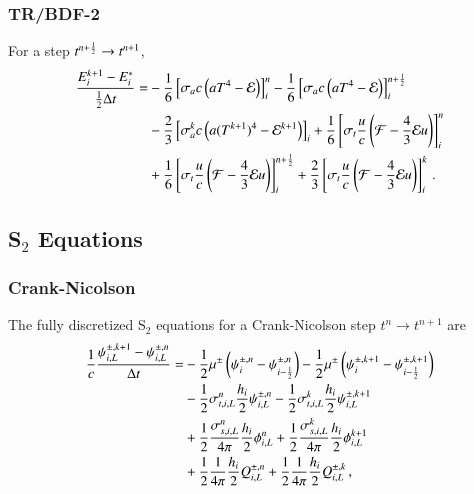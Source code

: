 \documentclass[preprint,12pt]{elsarticle}
\begin{document}
\subsubsection{TR/BDF-2}
For a step $t^{n+\frac{1}{2}}\rightarrow t^{n+1}$,
\begin{equation}\begin{split}
  \frac{E_i^{k+1}-E_i^*}{\half\dt} = &
  -\sixth\left[\sigma_a c\left(aT^4 - \E\right)\right]_i^n
  -\sixth\left[\sigma_a c\left(aT^4 - \E\right)\right]_i^{n+\half}\\
  &-\frac{2}{3}\left[\sigma_a^k c\left(a(T^{k+1})^4 - \E^{k+1}\right)\right]_i
   +\sixth\left[\sigma_t\frac{u}{c}\left(\F-\frac{4}{3}\E u\right)\right]_i^n\\
  &+\sixth\left[\sigma_t\frac{u}{c}\left(\F-\frac{4}{3}\E u\right)\right]_i^{n+\half}
   +\frac{2}{3}\left[\sigma_t\frac{u}{c}\left(\F-\frac{4}{3}\E u\right)\right]_i^k
  \pep
\lequ{hydroEBDF2full}
\end{split}\end{equation}

\subsection{\texorpdfstring{S$_2$}{S-2} Equations}
\subsubsection{Crank-Nicolson}
The fully discretized S$_2$ equations for a Crank-Nicolson step
$t^n\rightarrow t^{n+1}$ are
\begin{equation}\begin{split}
\frac{1}{c}\frac{\psi\iL^{\pm,k+1}-\psi\iL^{\pm,n}}{\dt} = &
  -\half\mu^\pm\fn{\psi^{\pm,n}_i - \psi^{\pm,n}_{i-\half}}
  -\half\mu^\pm\fn{\psi^{\pm,k+1}_i - \psi^{\pm,k+1}_{i-\half}}\\
  &-\half\sigma_{t,i,L}^n\frac{h_i}{2}\psi\iL^{\pm,n}
   -\half\sigma_{t,i,L}^k\frac{h_i}{2}\psi\iL^{\pm,k+1}\\
  &+\half\frac{\sigma_{s,i,L}^n}{4\pi}\frac{h_i}{2}\phi\iL^n
   +\half\frac{\sigma_{s,i,L}^k}{4\pi}\frac{h_i}{2}\phi\iL^{k+1}\\
  &+\half\frac{1}{4\pi}\frac{h_i}{2}Q_{i,L}^{\pm,n}
   +\half\frac{1}{4\pi}\frac{h_i}{2}Q_{i,L}^{\pm,k} \pec
\lequ{S2CNfullL}
\end{split}\end{equation}
\end{document}
